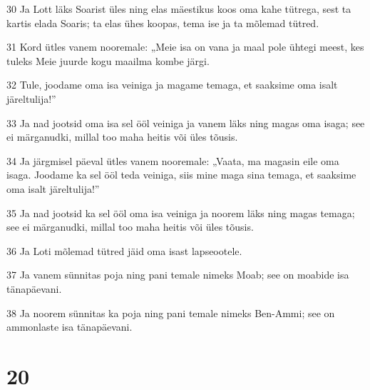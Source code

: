 \par 30 Ja Lott läks Soarist üles ning elas mäestikus koos oma kahe tütrega, sest ta kartis elada Soaris; ta elas ühes koopas, tema ise ja ta mõlemad tütred.
\par 31 Kord ütles vanem nooremale: „Meie isa on vana ja maal pole ühtegi meest, kes tuleks Meie juurde kogu maailma kombe järgi.
\par 32 Tule, joodame oma isa veiniga ja magame temaga, et saaksime oma isalt järeltulija!”
\par 33 Ja nad jootsid oma isa sel ööl veiniga ja vanem läks ning magas oma isaga; see ei märganudki, millal too maha heitis või üles tõusis.
\par 34 Ja järgmisel päeval ütles vanem nooremale: „Vaata, ma magasin eile oma isaga. Joodame ka sel ööl teda veiniga, siis mine maga sina temaga, et saaksime oma isalt järeltulija!”
\par 35 Ja nad jootsid ka sel ööl oma isa veiniga ja noorem läks ning magas temaga; see ei märganudki, millal too maha heitis või üles tõusis.
\par 36 Ja Loti mõlemad tütred jäid oma isast lapseootele.
\par 37 Ja vanem sünnitas poja ning pani temale nimeks Moab; see on moabide isa tänapäevani.
\par 38 Ja noorem sünnitas ka poja ning pani temale nimeks Ben-Ammi; see on ammonlaste isa tänapäevani.

\chapter{20}

